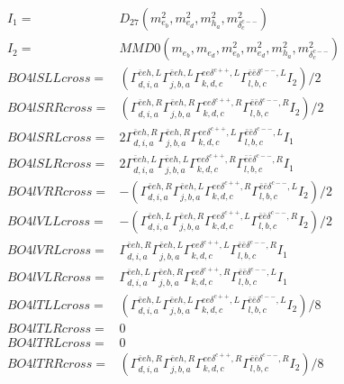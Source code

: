 \documentclass[A4,landscape]{article}
\begin{document}
\begin{align} 
I_1 = & D_{27}(m^2_{e_{{b}}}, m^2_{e_{{d}}}, m^2_{h_{{a}}}, m^2_{\delta^{c--}_{{c}}}) \\ 
I_2 = & MMD0(m_{e_{{b}}}, m_{e_{{d}}}, m^2_{e_{{b}}}, m^2_{e_{{d}}}, m^2_{h_{{a}}}, m^2_{\delta^{c--}_{{c}}}) \\ 
  BO4lSLLcross= & ( \Gamma^{\bar{e}e h ,L}_{d, i, a} \Gamma^{\bar{e}e h ,L}_{j, b, a} \Gamma^{e e \delta^{c++},L}_{k, d, c} \Gamma^{\bar{e}\bar{e}\delta^{c--} ,L}_{l, b, c} I_2)/2 \\ 
  BO4lSRRcross= & ( \Gamma^{\bar{e}e h ,R}_{d, i, a} \Gamma^{\bar{e}e h ,R}_{j, b, a} \Gamma^{e e \delta^{c++},R}_{k, d, c} \Gamma^{\bar{e}\bar{e}\delta^{c--} ,R}_{l, b, c} I_2)/2 \\ 
  BO4lSRLcross= & 2  \Gamma^{\bar{e}e h ,R}_{d, i, a} \Gamma^{\bar{e}e h ,R}_{j, b, a} \Gamma^{e e \delta^{c++},L}_{k, d, c} \Gamma^{\bar{e}\bar{e}\delta^{c--} ,L}_{l, b, c} I_1 \\ 
  BO4lSLRcross= & 2  \Gamma^{\bar{e}e h ,L}_{d, i, a} \Gamma^{\bar{e}e h ,L}_{j, b, a} \Gamma^{e e \delta^{c++},R}_{k, d, c} \Gamma^{\bar{e}\bar{e}\delta^{c--} ,R}_{l, b, c} I_1 \\ 
  BO4lVRRcross= & -( \Gamma^{\bar{e}e h ,R}_{d, i, a} \Gamma^{\bar{e}e h ,L}_{j, b, a} \Gamma^{e e \delta^{c++},R}_{k, d, c} \Gamma^{\bar{e}\bar{e}\delta^{c--} ,L}_{l, b, c} I_2)/2 \\ 
  BO4lVLLcross= & -( \Gamma^{\bar{e}e h ,L}_{d, i, a} \Gamma^{\bar{e}e h ,R}_{j, b, a} \Gamma^{e e \delta^{c++},L}_{k, d, c} \Gamma^{\bar{e}\bar{e}\delta^{c--} ,R}_{l, b, c} I_2)/2 \\ 
  BO4lVRLcross= &  \Gamma^{\bar{e}e h ,R}_{d, i, a} \Gamma^{\bar{e}e h ,L}_{j, b, a} \Gamma^{e e \delta^{c++},L}_{k, d, c} \Gamma^{\bar{e}\bar{e}\delta^{c--} ,R}_{l, b, c} I_1 \\ 
  BO4lVLRcross= &  \Gamma^{\bar{e}e h ,L}_{d, i, a} \Gamma^{\bar{e}e h ,R}_{j, b, a} \Gamma^{e e \delta^{c++},R}_{k, d, c} \Gamma^{\bar{e}\bar{e}\delta^{c--} ,L}_{l, b, c} I_1 \\ 
  BO4lTLLcross= & ( \Gamma^{\bar{e}e h ,L}_{d, i, a} \Gamma^{\bar{e}e h ,L}_{j, b, a} \Gamma^{e e \delta^{c++},L}_{k, d, c} \Gamma^{\bar{e}\bar{e}\delta^{c--} ,L}_{l, b, c} I_2)/8 \\ 
  BO4lTLRcross= & 0 \\ 
  BO4lTRLcross= & 0 \\ 
  BO4lTRRcross= & ( \Gamma^{\bar{e}e h ,R}_{d, i, a} \Gamma^{\bar{e}e h ,R}_{j, b, a} \Gamma^{e e \delta^{c++},R}_{k, d, c} \Gamma^{\bar{e}\bar{e}\delta^{c--} ,R}_{l, b, c} I_2)/8 \\ 
\end{align} 
\end{document}
